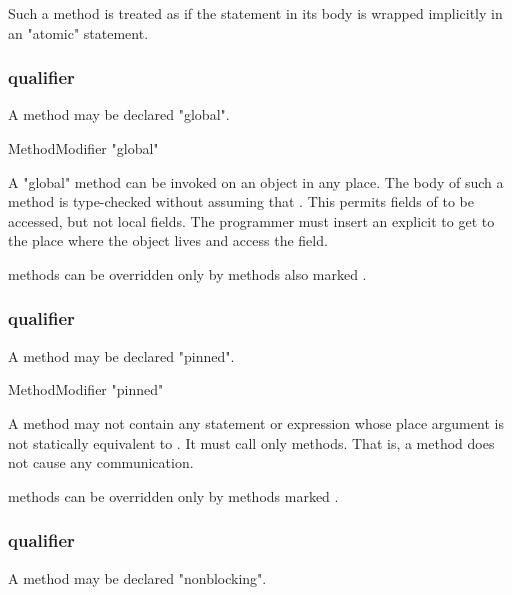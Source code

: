 Such a method is treated as if the statement in its body is wrapped 
implicitly in an \xcd"atomic" statement.

\subsubsection{ qualifier}
\label{LocalAnnotation}
\label{GlobalMethod}

A method may be declared \xcd"global".

\begin{grammar}
  MethodModifier \: \xcd"global"  
\end{grammar}

A \xcd"global" method can be invoked on an object  in any place. The
body of such a method is type-checked without assuming that
. This permits  fields of  to
be accessed, but not local fields. The programmer must insert an explicit
 to get to the place where the object lives and access
the field.

 methods can be overridden only by methods also marked .

\subsubsection{ qualifier}
\label{PinnedAnnotation}
\label{PinnedMethod}

A method may be declared \xcd"pinned".

\begin{grammar}
  MethodModifier \: \xcd"pinned"  
\end{grammar}

A  method may not
contain any  statement or expression whose place argument
is not statically equivalent to . It must call only
 methods. That is, a  method does not cause
any communication.

 methods can be overridden only by methods marked .

\subsubsection{ qualifier}
\label{NonblockingAnnotation}
\label{NonblockingMethod}

A method may be declared \xcd"nonblocking".

